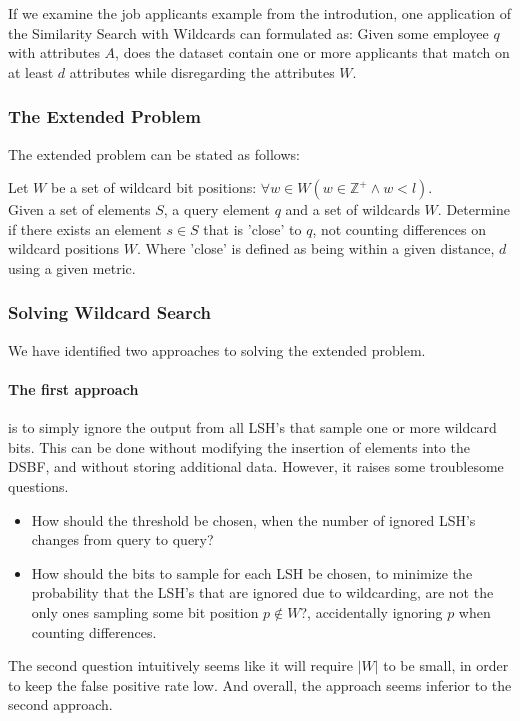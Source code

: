 \documentclass[a4paper,11pt]{article}
\begin{document}
If we examine the job applicants example from the introdution, one application of the Similarity Search with Wildcards can formulated as: Given some employee $q$ with attributes $A$, does the dataset contain one or more applicants that match on at least $d$ attributes while disregarding the attributes $W$.

\subsubsection*{The Extended Problem}
The extended problem can be stated as follows:

Let $W$ be a set of wildcard bit positions: $\forall w \in W (w \in \mathbb{Z}^+ \land w < l)$.\\
Given a set of elements $S$, a query element $q$ and a set of wildcards $W$. Determine if there exists an element $s \in S$ that is 'close' to $q$, not counting differences on wildcard positions $W$. Where 'close' is defined as being within a given distance, $d$ using a given metric.

\subsubsection*{Solving Wildcard Search}
We have identified two approaches to solving the extended problem.
\paragraph{The first approach} is to simply ignore the output from all LSH's that sample one or more wildcard bits. This can be done without modifying the insertion of elements into the DSBF, and without storing additional data. However, it raises some troublesome questions.

\begin{itemize}
\item How should the threshold be chosen, when the number of ignored LSH's changes from query to query?
\item How should the bits to sample for each LSH be chosen, to minimize the probability that the LSH's that are ignored due to wildcarding, are not the only ones sampling some bit position $p \notin W$?, accidentally ignoring $p$ when counting differences.
\end{itemize}

The second question intuitively seems like it will require $|W|$ to be small, in order to keep the false positive rate low. And overall, the approach seems inferior to the second approach.
\end{document}
